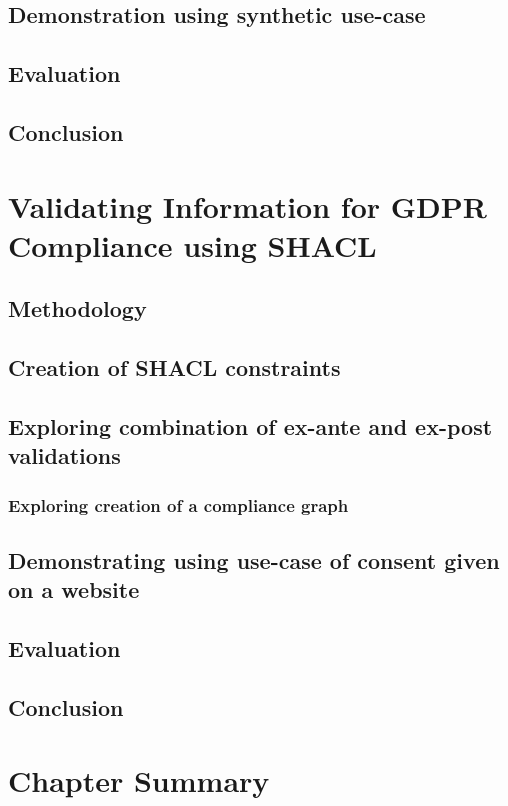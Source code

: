 \subsection{Demonstration using synthetic use-case}\label{sec:testing:sparql:demo}


\subsection{Evaluation}\label{sec:testing:sparql:evaluation}

\subsection*{Conclusion}

\section{Validating Information for GDPR Compliance using SHACL}\label{sec:testing:shacl}

\subsection{Methodology}\label{sec:testing:shacl:methodology}

\subsection{Creation of SHACL constraints}\label{sec:testing:shacl:constraints}

\subsection{Exploring combination of ex-ante and ex-post validations}\label{sec:testing:shacl:combine}

\subsubsection{Exploring creation of a compliance graph}\label{sec:testing:shacl:compliance-graph}

\subsection{Demonstrating using use-case of consent given on a website}\label{sec:testing:shacl:demo}

\subsection{Evaluation}\label{sec:testing:shacl:eval}

\subsection*{Conclusion}

\section*{Chapter Summary}
